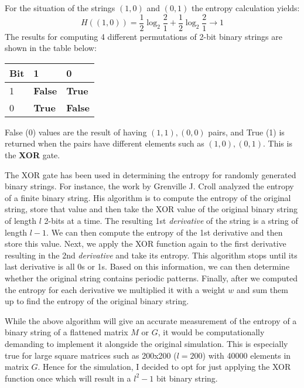 \vspace{0.3cm}
For the situation of the strings $(1,0)$ and $(0,1)$ the entropy calculation yields:
$$H((1,0))=\frac{1}{2}\log_{2}\frac{2}{1}+\frac{1}{2}\log_{2}\frac{2}{1}\longrightarrow 1$$
The results for computing 4 different permutations of 2-bit binary strings are shown in the table below: 
\begin{center}
\begin{tabular}{ |p{3cm}||p{3cm}||p{3cm}|  }
\hline
Bit& 1 & 0 \\
 \hline
 1  & \textbf{False} & \textbf{True}\\  
 0 &  \textbf{True} & \textbf{False}\\
  \hline
\end{tabular}
\end{center}
 False (0) values are the result of having $(1,1), (0,0)$ pairs, and True (1) is returned when the pairs have different elements such as $(1,0), (0,1)$. This is the \textbf{XOR} gate. \par

\pagebreak
 The XOR gate has been used in determining the entropy for randomly generated binary strings. For instance, the work by Grenville J. Croll \cite{Grenville} analyzed the entropy of a finite binary string. His algorithm is to compute the entropy of the original string, store that value and then take the XOR value of the original binary string of length $l$ 2-bits at a time. The resulting 1st \emph{derivative} of the string is a string of length $l-1$. We can then compute the entropy of the 1st derivative and then store this value. Next, we apply the XOR function again to the first derivative resulting in the 2nd \emph{derivative} and take its entropy. This algorithm stops until its last derivative is all 0s or 1s. Based on this information, we can then determine whether the original string contains periodic patterns. Finally, after we computed the entropy for each derivative we multiplied it with a weight $w$ and sum them up to find the entropy of the original binary string. \par

 \vspace{0.3cm}
 While the above algorithm will give an accurate measurement of the entropy of a binary string of a flattened matrix $M$ or $G$, it would be computationally demanding to implement it alongside the original simulation. This is especially true for large square matrices such as 200x200 ($l=200$) with 40000 elements in matrix $G$. Hence for the simulation, I decided to opt for just applying the XOR function once which will result in a $l^2-1$ bit binary string. \par

